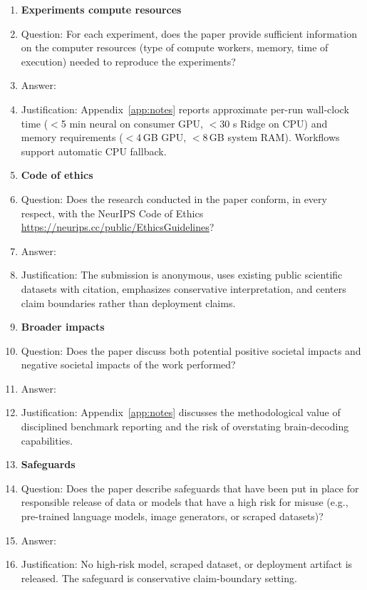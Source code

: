 \begin{enumerate}
\item {\bf Experiments compute resources}
    \item[] Question: For each experiment, does the paper provide sufficient information on the computer resources (type of compute workers, memory, time of execution) needed to reproduce the experiments?
    \item[] Answer: \answerYes{}
    \item[] Justification: Appendix~\ref{app:notes} reports approximate per-run wall-clock time ($<$5 min neural on consumer GPU, $<$30 s Ridge on CPU) and memory requirements ($<$4\,GB GPU, $<$8\,GB system RAM).  Workflows support automatic CPU fallback.

\item {\bf Code of ethics}
    \item[] Question: Does the research conducted in the paper conform, in every respect, with the NeurIPS Code of Ethics \url{https://neurips.cc/public/EthicsGuidelines}?
    \item[] Answer: \answerYes{}
    \item[] Justification: The submission is anonymous, uses existing public scientific datasets with citation, emphasizes conservative interpretation, and centers claim boundaries rather than deployment claims.

\item {\bf Broader impacts}
    \item[] Question: Does the paper discuss both potential positive societal impacts and negative societal impacts of the work performed?
    \item[] Answer: \answerYes{}
    \item[] Justification: Appendix~\ref{app:notes} discusses the methodological value of disciplined benchmark reporting and the risk of overstating brain-decoding capabilities.

\item {\bf Safeguards}
    \item[] Question: Does the paper describe safeguards that have been put in place for responsible release of data or models that have a high risk for misuse (e.g., pre-trained language models, image generators, or scraped datasets)?
    \item[] Answer: \answerNA{}
    \item[] Justification: No high-risk model, scraped dataset, or deployment artifact is released.  The safeguard is conservative claim-boundary setting.


\end{enumerate}
